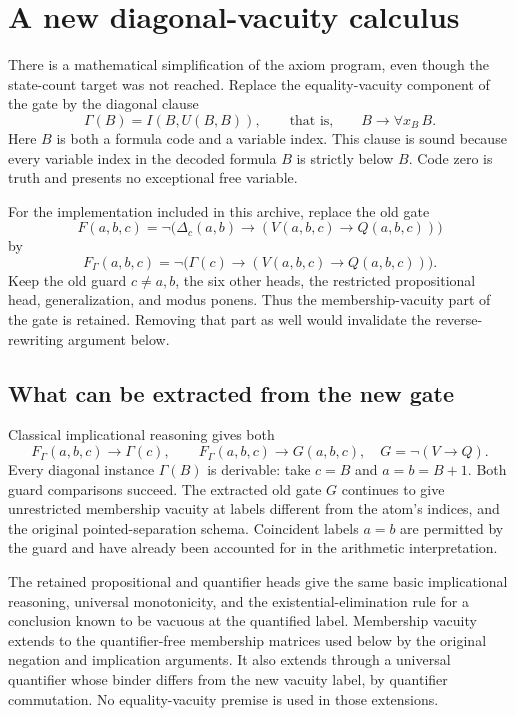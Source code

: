 \section{A new diagonal-vacuity calculus}\label{sec:diagonal}
There is a mathematical simplification of the axiom program, even though the state-count target was not reached. Replace the equality-vacuity component of the gate by the diagonal clause
\begin{equation}\label{eq:gamma}
 \Gamma(B)=I(B,U(B,B)),\qquad\text{that is,}\qquad B\longrightarrow\forall x_B\,B.
\end{equation}
Here \(B\) is both a formula code and a variable index. This clause is sound because every variable index in the decoded formula \(B\) is strictly below \(B\). Code zero is truth and presents no exceptional free variable.

For the implementation included in this archive, replace the old gate
\[
 F(a,b,c)=\neg\bigl(\Delta_c(a,b)\to(V(a,b,c)\to Q(a,b,c))\bigr)
\]
by
\begin{equation}\label{eq:new-gate}
 F_\Gamma(a,b,c)=\neg\bigl(\Gamma(c)\to(V(a,b,c)\to Q(a,b,c))\bigr).
\end{equation}
Keep the old guard \(c\ne a,b\), the six other heads, the restricted propositional head, generalization, and modus ponens. Thus the membership-vacuity part of the gate is retained. Removing that part as well would invalidate the reverse-rewriting argument below.

\subsection{What can be extracted from the new gate}
Classical implicational reasoning gives both
\[
 F_\Gamma(a,b,c)\to\Gamma(c),\qquad
 F_\Gamma(a,b,c)\to G(a,b,c),
 \quad G=\neg(V\to Q).
\]
Every diagonal instance \(\Gamma(B)\) is derivable: take \(c=B\) and \(a=b=B+1\). Both guard comparisons succeed. The extracted old gate \(G\) continues to give unrestricted membership vacuity at labels different from the atom's indices, and the original pointed-separation schema. Coincident labels \(a=b\) are permitted by the guard and have already been accounted for in the arithmetic interpretation.

The retained propositional and quantifier heads give the same basic implicational reasoning, universal monotonicity, and the existential-elimination rule for a conclusion known to be vacuous at the quantified label. Membership vacuity extends to the quantifier-free membership matrices used below by the original negation and implication arguments. It also extends through a universal quantifier whose binder differs from the new vacuity label, by quantifier commutation. No equality-vacuity premise is used in those extensions.

